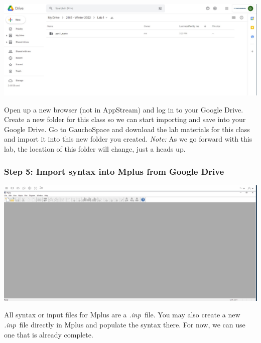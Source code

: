 \documentclass[
]{article}
\begin{document}
\includegraphics{import.jpg}

Open up a new browser (not in AppStream) and log in to your Google
Drive. Create a new folder for this class so we can start importing and
save into your Google Drive. Go to GauchoSpace and download the lab
materials for this class and import it into this new folder you created.
\emph{Note:} As we go forward with this lab, the location of this folder
will change, just a heads up.

\hypertarget{step-5-import-syntax-into-mplus-from-google-drive}{%
\subsubsection{Step 5: Import syntax into Mplus from Google
Drive}\label{step-5-import-syntax-into-mplus-from-google-drive}}

\includegraphics{inp.gif}

All syntax or input files for Mplus are a \emph{.inp}~file. You may also
create a new \emph{.inp}~file directly in Mplus and populate the syntax
there. For now, we can use one that is already complete.
\end{document}
